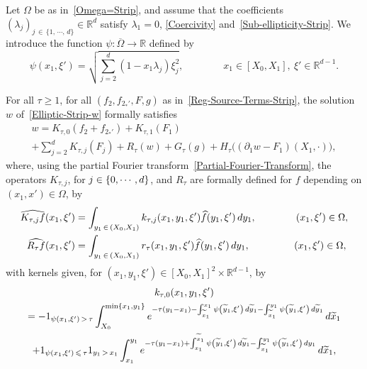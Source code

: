 \documentclass[10pt]{amsart}
\theoremstyle{definition}\newtheorem{defi}[theo]{Definition}\newtheorem{rema}[theo]{Remark}\newtheorem{exam}[theo]{Example}\newtheorem{exem}[theo]{Example}\newtheorem{nota}[theo]{Notation}
\newcommand*\R{\mathbb{R}}
\renewcommand{\leq}{\leqslant}
\renewcommand{\geq}{\geqslant}
\renewcommand{\tilde}{\widetilde}
\let\oldtilde\tilde
\renewcommand*{\tilde}[1]{\mathchoice{\widetilde{#1}}{\widetilde{#1}}{\oldtilde{#1}}{\oldtilde{#1}}}
\begin{document}
\break
\begin{prop}\label{Prop-parametrix-Strip-1}
Let $\Omega$ be as in~\eqref{Omega=Strip}, and assume that the coefficients $(\lambda_j)_{j \,\in\,\{1,\,\cdots,\,d\}} \in \R^d$ satisfy $\lambda_1 = 0$, \eqref{Coercivity} and~\eqref{Sub-ellipticity-Strip}. We introduce the function $\psi : \overline\Omega \to \R$ defined by
\begin{equation}\label{Def-Psi}
\psi(x_1, \xi')=\sqrt{ \sum_{j=2}^{d}\left(1-x_{1} \lambda_{j}\right) \xi_{j} ^2},
\qquad \qquad x_1 \in [X_0,X_1], \ \xi'\in \R^{d-1}.
\end{equation}

For all $\tau \geq 1$, for all $(f_2, f_{2_*'},F,g)$ as in~\eqref{Reg-Source-Terms-Strip}, the solution $w$ of~\eqref{Elliptic-Strip-w} formally satisfies
\begin{multline}\label{parametrix}
w = K_{\tau,0} \left(f_2 + f_{2_*'}\right) + K_{\tau,1}(F_1) \\
+ \sum_{j = 2}^d K_{\tau,j} (F_j) + R_\tau (w) + G_\tau(g) + H_\tau\big((\partial_1 w -F_1)(X_1, \cdot)\big),
\end{multline}
where, using the partial Fourier transform~\eqref{Partial-Fourier-Transform}, the operators $K_{\tau,j}$, for $j \in \{0,\linebreak\cdots, d\}$, and $R_\tau$ are formally defined for $f$ depending on $(x_1, x') \in \Omega$, by
\begin{align}
\widehat {K_{\tau,j} f}(x_1, \xi') & = \int_{y_1\, \in\,(X_0,X_1)} k_{\tau,j}(x_1,y_1, \xi') \widehat f(y_1, \xi') \, dy_1,
\qquad \qquad(x_1, \xi') \in \Omega,\label{Def-K-tau-j-Fourier}
\\
\widehat {R_{\tau} f}(x_1, \xi') & = \int_{y_1 \,\in\,(X_0,X_1)} r_{\tau}(x_1,y_1, \xi') \widehat f(y_1, \xi') \, dy_1,
\mkern80mu (x_1, \xi') \in \Omega,\label{Def-R-tau-Fourier}
\end{align}
with kernels given, for $(x_1,y_1, \xi') \in [X_0,X_1]^2 \times \R^{d-1}$, by
\begin{multline}\label{Def-k-tau-0-x1-y1-xi'}
k_{\tau,0}(x_1, y_1, \xi')\\
= -1_{\psi(x_1,\xi') \,>\,\tau} \int_{X_0}^{\min \{ x_1, y_1\}} e^{-\tau(y_1-x_1)-\int_{\tilde{x}_1}^{x_1} \psi\left(\tilde{y}_1,\xi'\right) \, d\tilde{y}_1 - \int_{{\tilde{x}_1}}^{y_1} \psi\left(\tilde{y}_1,\xi'\right) \,d \tilde{y}_1 } \, d \tilde{x}_1
\\
+1_{\psi(x_1,\xi')\,\leq\,\tau} 1_{y_1\,>\,x_1} \int_{x_1}^{y_1} e^{-\tau (y_1-x_1)+\int_{x_1}^{\tilde{x}_1} \psi\left(\tilde{y}_1,\xi'\right) \, d \tilde{y}_1-\int_{{\tilde{x}_1}}^{y_1} \psi\left(\tilde{y}_1,\xi'\right) \, d y_1} \, d \tilde{x}_1,

\end{multline}
\end{prop}
\end{document}
